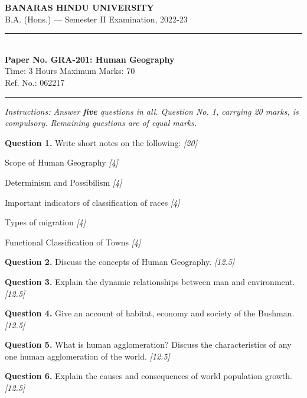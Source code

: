 \documentclass[11pt,a4paper]{article}
\newcommand{\pts}[1]{\hfill   \textit{[#1]}}
\begin{document}
\begin{center}
  {\large\bfseries BANARAS HINDU UNIVERSITY}\\[2pt]
  {\normalsize B.A. (Hons.) --- Semester II Examination, 2022-23}\\[6pt]
  \rule{0.8\linewidth}{0.5pt}\\[6pt]
  {\large\bfseries Paper No. GRA-201: Human Geography}\\[4pt]
  {\normalsize Time: 3 Hours \hfill Maximum Marks: 70}\\[2pt]
  {\small Ref. No.: 062217}
\end{center}
\rule{\linewidth}{0.4pt}
\smallskip



\noindent   \textit{Instructions: Answer   \textbf{five} questions in all. Question No. 1, carrying 20 marks, is compulsory. Remaining questions are of equal marks.}
\bigskip




\noindent   \textbf{Question 1.} Write short notes on the following: \pts{20}

\begin{parts}
  \item Scope of Human Geography \pts{4}
  \item Determinism and Possibilism \pts{4}
  \item Important indicators of classification of races \pts{4}
  \item Types of migration \pts{4}
  \item Functional Classification of Towns \pts{4}
\end{parts}

\medskip


\noindent   \textbf{Question 2.} Discuss the concepts of Human Geography. \pts{12.5}

\medskip


\noindent   \textbf{Question 3.} Explain the dynamic relationships between man and environment. \pts{12.5}

\medskip


\noindent   \textbf{Question 4.} Give an account of habitat, economy and society of the Bushman. \pts{12.5}

\medskip


\noindent   \textbf{Question 5.} What is human agglomeration? Discuss the characteristics of any one human agglomeration of the world. \pts{12.5}

\medskip


\noindent   \textbf{Question 6.} Explain the causes and consequences of world population growth. \pts{12.5}
\end{document}
